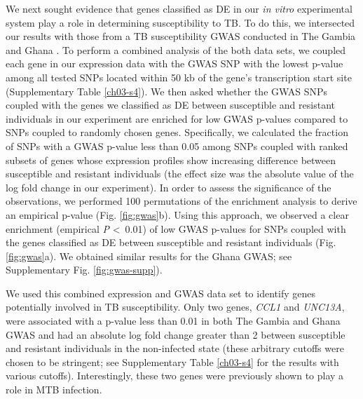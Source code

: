 We next sought evidence that genes classified as DE in our \emph{in
vitro} experimental system play a role in determining susceptibility
to TB. To do this, we intersected our results with those from a TB
susceptibility GWAS conducted in The Gambia and Ghana \citep{Thye2010}.
To perform a combined analysis of the both data sets, we coupled each
gene in our expression data with the GWAS SNP with the lowest p-value
among all tested SNPs located within 50 kb of the gene's transcription
start site (Supplementary Table \ref{ch03-s4}). We then asked whether the GWAS
SNPs coupled with the genes we classified as DE between susceptible
and resistant individuals in our experiment are enriched for low GWAS
p-values compared to SNPs coupled to randomly chosen genes.
Specifically, we calculated the fraction of SNPs with a GWAS p-value
less than 0.05 among SNPs coupled with ranked subsets of genes whose
expression profiles show increasing difference between susceptible and
resistant individuals (the effect size was the absolute value of the
log fold change in our experiment). In order to assess the
significance of the observations, we performed 100 permutations of the
enrichment analysis to derive an empirical p-value (Fig.
\ref{fig:gwas}b). Using this approach, we observed a clear enrichment
(empirical \emph{P} \textless \, 0.01) of low GWAS p-values for SNPs
coupled with the genes classified as DE between susceptible and
resistant individuals (Fig. \ref{fig:gwas}a). We obtained similar
results for the Ghana GWAS; see Supplementary Fig.
\ref{fig:gwas-supp}).

We used this combined expression and GWAS data set to identify genes
potentially involved in TB susceptibility. Only two genes, \emph{CCL1}
and \emph{UNC13A}, were associated with a p-value less than 0.01 in
both The Gambia and Ghana GWAS and had an absolute log fold change
greater than 2 between susceptible and resistant individuals in the
non-infected state (these arbitrary cutoffs were chosen to be
stringent; see Supplementary Table \ref{ch03-s4} for the results with various
cutoffs). Interestingly, these two genes were previously shown to play
a role in MTB infection.

